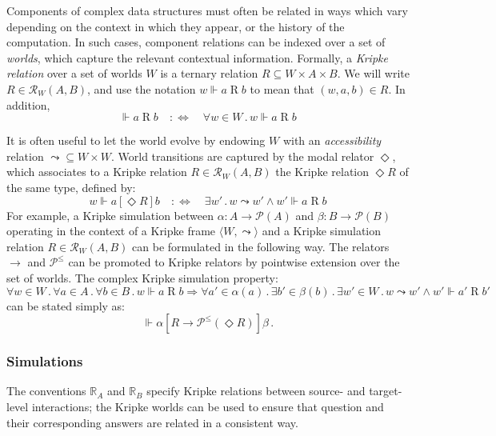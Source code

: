 \documentclass[acmsmall,screen,review,anonymous]{acmart}
\newcommand{\ifr}[1]{\mathrel{[{#1}]}}
\begin{document}
Components of complex data structures
must often be related in ways which vary
depending on the context in which they appear,
or the history of the computation.
In such cases,
component relations can be indexed over a set of \emph{worlds},
which capture the relevant contextual information.
Formally, a \emph{Kripke relation} over a set of worlds $W$
is a ternary relation $R \subseteq W \times A \times B$.
We will write $R \in \mathcal{R}_W(A, B)$,
and use the notation
$
  w \Vdash a \mathrel{R} b
$
to mean that $(w, a, b) \in R$.
In addition,
\[
  {} \Vdash a \mathrel{R} b
  \quad :\Leftrightarrow \quad
  \forall w\in W \mathbin. w \Vdash a \mathrel{R} b
\]

It is often useful to let the world evolve
by endowing $W$ with an \emph{accessibility} relation
${\leadsto} \subseteq W \times W$.
World transitions are captured by the modal relator $\Diamond$,
which associates to a Kripke relation $R \in \mathcal{R}_W(A, B)$
the Kripke relation $\Diamond R$ of the same type, defined by:
\[
  w \Vdash a \ifr{\Diamond R} b
  \quad:\Leftrightarrow\quad
  \exists w' \mathbin. w \leadsto w' \wedge w' \Vdash a \mathrel{R} b
\]
For example,
a Kripke simulation between $\alpha : A \rightarrow \mathcal{P}(A)$
and $\beta : B \rightarrow \mathcal{P}(B)$
operating in the context of a Kripke frame $\langle W, {\leadsto} \rangle$
and a Kripke simulation relation $R \in \mathcal{R}_W(A, B)$
can be formulated in the following way.
The relators $\rightarrow$ and $\mathcal{P}^\le$
can be promoted to Kripke relators
by pointwise extension over the set of worlds.
The complex Kripke simulation property:
{\small
\[
  \forall w \in W \mathbin.
  \forall a \in A \mathbin.
  \forall b \in B \mathbin.
  w \Vdash a \mathrel{R} b \Rightarrow
  \forall a' \in \alpha(a) \mathbin.
  \exists b' \in \beta(b) \mathbin.
  \exists w' \in W \mathbin.
  w \leadsto w' \wedge w' \Vdash a' \mathrel{R} b'
\]
}
can be stated simply as:
\[
  \Vdash \alpha \ifr{R \rightarrow \mathcal{P}^\le(\Diamond R)} \beta
  \,.
\]


\subsubsection{Simulations} %

The conventions $\mathbb{R}_A$ and $\mathbb{R}_B$
specify Kripke relations between source- and target-level interactions;
the Kripke worlds can be used to ensure that
question and their corresponding answers
are related in a consistent way.
\end{document}
